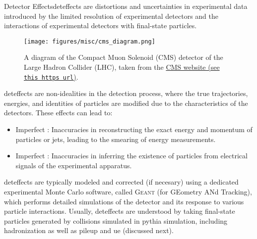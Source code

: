 \begin{subappendices}
\begin{definitionbox}{Detector Effects}{deteffects}
     are distortions and uncertainties in experimental data introduced by the limited resolution of experimental detectors and the interactions of experimental detectors with final-state particles.
\end{definitionbox}


\begin{figure}[]
    \centering
    \texttt{[image: figures/misc/cms\_diagram.png]}
    \caption[Cartoon of the structure of the CMS detector.]{
        A diagram of the Compact Muon Solenoid (CMS) detector of the Large Hadron Collider (LHC), taken from the \href{https://cms.cern/detector}{CMS website (see \texttt{this https url})}.
    }
    \label{fig:cms}
\end{figure}

\Gls{deteffects} are non-idealities in the detection process, where the true trajectories, energies, and identities of particles are modified due to the characteristics of the detectors.
%
These effects can lead to:
\begin{itemize}
    \item
    Imperfect :
    Inaccuracies in reconstructing the exact energy and momentum of particles or jets, leading to the smearing of energy measurements.

    \item
    Imperfect :
    Inaccuracies in inferring the existence of particles from electrical signals of the experimental apparatus.
\end{itemize}

\Gls{deteffects} are typically modeled and corrected (if necesary) using a dedicated experimental Monte Carlo software, called \textsc{Geant} (for GEometry ANd Tracking), which performs detailed simulations of the detector and its response to various particle interactions.
%
Usually, \gls{deteffects} are understood by taking final-state particles generated by collisions simulated in \gls{pythia} simulation, including \gls{hadronization} as well as \gls{pileup} and \gls{ue} (discussed next).






\end{subappendices}
